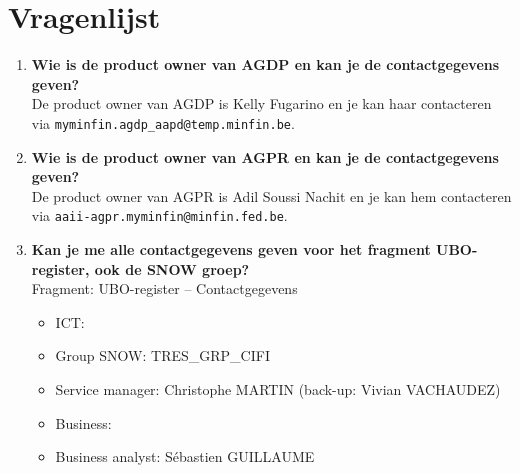 \section{Vragenlijst}
\label{vragenlijst}

\begin{enumerate}
    \item \textbf{Wie is de product owner van AGDP en kan je de contactgegevens geven?} \\
    De product owner van AGDP is Kelly Fugarino en je kan haar contacteren via \texttt{myminfin.agdp\_aapd@temp.minfin.be}.
    
    \item \textbf{Wie is de product owner van AGPR en kan je de contactgegevens geven?} \\
    De product owner van AGPR is Adil Soussi Nachit en je kan hem contacteren via \texttt{aaii-agpr.myminfin@minfin.fed.be}.
    
    \item \textbf{Kan je me alle contactgegevens geven voor het fragment UBO-register, ook de SNOW groep?} \\
    Fragment: UBO-register – Contactgegevens
    \begin{itemize}
        \item ICT:
        \item Group SNOW: TRES\_GRP\_CIFI
        \item Service manager: Christophe MARTIN (back-up: Vivian VACHAUDEZ)
        \item Business:
        \item Business analyst: Sébastien GUILLAUME
    \end{itemize}
    

\end{enumerate}
